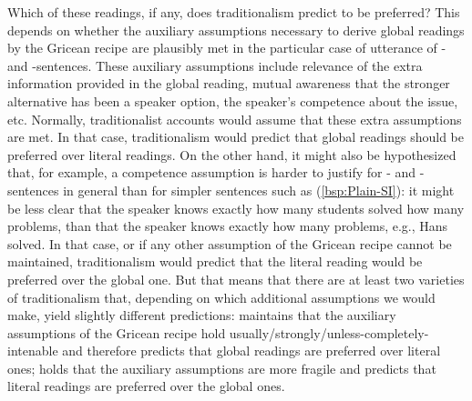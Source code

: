 \documentclass[fleqn,reqno,10pt,draft]{article}
\newcommand{\as}{\acro{as}}
\renewcommand{\es}{\acro{es}}
\begin{document}
Which of these readings, if any, does traditionalism predict to be
preferred? This depends on whether the auxiliary assumptions necessary
to derive global readings by the Gricean recipe are plausibly met in
the particular case of utterance of \as- and \es-sentences. These
auxiliary assumptions include relevance of the extra information
provided in the global reading, mutual awareness that the stronger
alternative has been a speaker option, the speaker's competence about
the issue, etc. Normally, traditionalist accounts would assume that
these extra assumptions are met. In that case, traditionalism would
predict that global readings should be preferred over literal
readings. On the other hand, it might also be hypothesized that, for
example, a competence assumption is harder to justify for \as- and
\es-sentences in general than for simpler sentences such as
(\ref{bsp:Plain-SI}): it might be less clear that the speaker knows
exactly how many students solved how many problems, than that the
speaker knows exactly how many problems, e.g., Hans solved. In that
case, or if any other assumption of the Gricean recipe cannot be
maintained, traditionalism would predict that the literal reading
would be preferred over the global one. But that means that there are
at least two varieties of traditionalism that, depending on which
additional assumptions we would make, yield slightly different
predictions:  maintains
that the auxiliary assumptions of the Gricean recipe hold
usually/strongly/unless-completely-intenable and therefore predicts
that global readings are preferred over literal ones;  holds that the auxiliary assumptions are
more fragile and predicts that literal readings are preferred over the
global ones.
\end{document}
